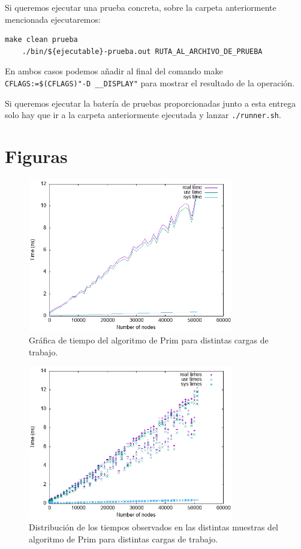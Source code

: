 \documentclass[6pt]{AiTex}
\begin{document}
Si queremos ejecutar una prueba concreta, sobre la carpeta anteriormente mencionada ejecutaremos:
\begin{lstlisting}[style=custombash]
    make clean prueba
    ./bin/${ejecutable}-prueba.out RUTA_AL_ARCHIVO_DE_PRUEBA
    \end{lstlisting}

En ambos casos podemos añadir al final del comando make \lstinline[style=custombash]{CFLAGS:=$(CFLAGS)"-D __DISPLAY"} para mostrar el resultado de la operación.

Si queremos ejecutar la batería de pruebas proporcionadas junto a esta entrega solo hay que ir a la carpeta anteriormente ejecutada y lanzar \lstinline[style=custombash]{./runner.sh}.



\section{Figuras}

\begin{figure}[H]
    \includegraphics[width = 0.8\textwidth]{./images/average-prim-plot.png}
    \caption{Gráfica de tiempo del algoritmo de Prim para distintas cargas de trabajo.}
    \label{fig:prim-plot}
\end{figure}

\begin{figure}[H]
    \includegraphics[width = 0.8\textwidth]{./images/prim-plot.png}
    \caption{Distribución de los tiempos observados en las distintas muestras del algoritmo de Prim para distintas cargas de trabajo.}
    \label{fig:prim-plot}
\end{figure}
\end{document}
